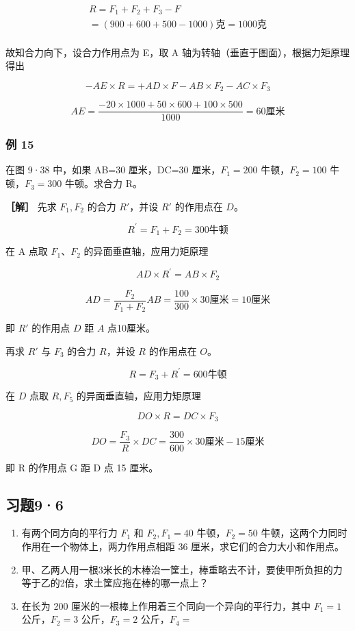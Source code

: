 \[
\begin{array}{l} R = F _ {1} + F _ {2} + F _ {3} - F \\ = (900 + 600 + 500 - 1000) \text{克} = 1000 \text{克} \\ \end{array}
\]

故知合力向下，设合力作用点为 E，取 A
轴为转轴（垂直于图面），根据力矩原理得出

\[
- A E \times R = + A D \times F - A B \times F _ {2} - A C \times F _ {3}
\]

\[
A E = \frac {- 20 \times 1000 + 50 \times 600 + 100 \times 500}{1000} = 60 \text{厘米}
\]

\subsubsection{例 15}\label{ux4f8b-15}

在图 9·38 中，如果 AB=30 厘米，DC=30 厘米，\(F_{1}=200\)
牛顿，\(F_{2}=100\) 牛顿，\(F_{3}=300\) 牛顿。求合力 R。

\textbf{［解］} 先求 \(F_{1}, F_{2}\) 的合力 \(R'\)，并设 \(R'\)
的作用点在 \(D\)。

\[
R ^ {\prime} = F _ {1} + F _ {2} = 300 \text{牛顿}
\]

在 A 点取 \(F_{1}\)、\(F_{2}\) 的异面垂直轴，应用力矩原理

\[
A D \times R ^ {\prime} = A B \times F _ {2}
\]

\[
AD=\frac{F_{2}}{F_{1}+F_{2}}AB =\frac{100}{300}\times30\text{厘米} =10\text{厘米}
\]

即 \(R'\) 的作用点 \(D\) 距 \(A\) 点10厘米。

再求 \(R'\) 与 \(F_{3}\) 的合力 \(R\)，并设 \(R\) 的作用点在 \(O\)。

\[
R = F _ {3} + R ^ {\prime} = 600 \text{牛顿}
\]

在 \(D\) 点取 \(R, F_{5}\) 的异面垂直轴，应用力矩原理

\[
D O \times R = D C \times F _ {3}
\]

\[
D O = \frac {F _ {3}}{R} \times D C = \frac {300}{600} \times 30 \text{厘米} - 15 \text{厘米}
\]

即 R 的作用点 G 距 D 点 15 厘米。

\subsection{习题9·6}\label{ux4e60ux989896}

\begin{enumerate}
\def\labelenumi{\arabic{enumi}.}
\item
  有两个同方向的平行力 \(F_{1}\) 和 \(F_{2}, F_{1} = 40\)
  牛顿，\(F_{2} = 50\)
  牛顿，这两个力同时作用在一个物体上，两力作用点相距 36
  厘米，求它们的合力大小和作用点。
\item
  甲、乙两人用一根3米长的木棒治一筐土，棒重略去不计，要使甲所负担的力等于乙的2倍，求土筐应拖在棒的哪一点上？
\item
  在长为 200 厘米的一根棒上作用着三个同向一个异向的平行力，其中
  \(F_{1} = 1\) 公斤，\(F_{2} = 3\) 公斤，\(F_{3} = 2\)
  公斤，\(F_{4} =\)
\end{enumerate}

